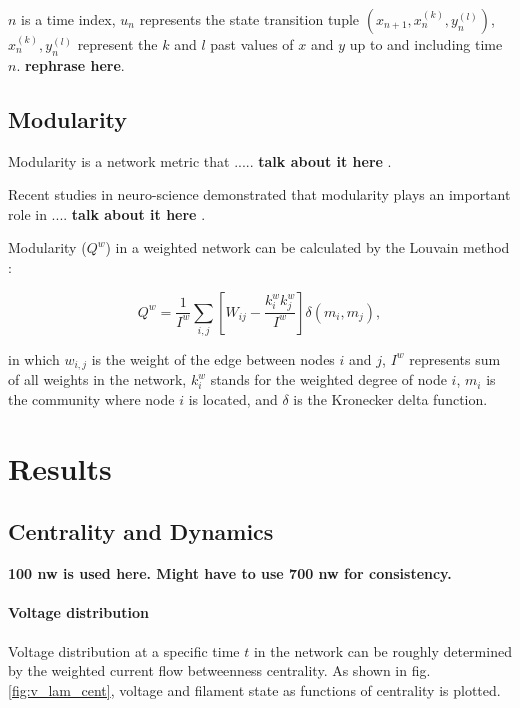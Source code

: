 \documentclass[%
 reprint,
 amsmath,amssymb,
 aps,
]{revtex4-2}
\begin{document}
$n$ is a time index, $u_n$ represents the state transition tuple $(x_{n+1}, x_n^{(k)}, y_n^{(l)})$, $x_n^{(k)}, y_n^{(l)}$ represent the $k$ and $l$ past values of $x$ and $y$ up to and including time $n$. \textbf{rephrase here}.

\subsection{\label{sec:level2} Modularity}
Modularity is a network metric that ..... \textbf{talk about it here} \cite{Rubinov2009}.

Recent studies in neuro-science demonstrated that modularity plays an important role in .... \textbf{talk about it here} \cite{Godwin2015}. 
 
Modularity ($Q^w$) in a weighted network can be calculated by the Louvain method \cite{Blondel2008}:
 
\begin{equation}
Q^w = \frac{1}{I^w} \sum \limits_{i,j} \left[W_{ij} - \frac{k_i^w k_j^w}{I^w} \right] \delta(m_i, m_j),
\end{equation}

in which $w_{i,j}$ is the weight of the edge between nodes $i$ and $j$, $I^w$ represents sum of all weights in the network, $k_i^w$ stands for the weighted degree of node $i$, $m_i$ is the community where node $i$ is located, and $\delta$ is the Kronecker delta function.

\section{\label{sec:level1} Results }

\subsection{\label{sec:level2} Centrality and Dynamics}

\textbf{100 nw is used here. Might have to use 700 nw for consistency.}


\paragraph{Voltage distribution}

Voltage distribution at a specific time $t$ in the network can be roughly determined by the weighted current flow betweenness centrality. As shown in fig. \ref{fig:v_lam_cent}, voltage and filament state as functions of centrality is plotted. 
\end{document}
